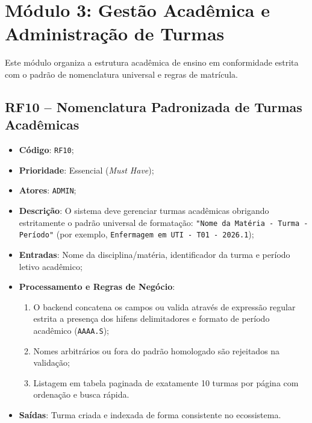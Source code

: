 \section{Módulo 3: Gestão Acadêmica e Administração de Turmas}
\label{sec_mod3_turmas}

Este módulo organiza a estrutura acadêmica de ensino em conformidade estrita com o padrão de nomenclatura universal e regras de matrícula.

\subsection{RF10 -- Nomenclatura Padronizada de Turmas Acadêmicas}
\begin{itemize}
    \item \textbf{Código}: \texttt{RF10};
    \item \textbf{Prioridade}: Essencial (\textit{Must Have});
    \item \textbf{Atores}: \texttt{ADMIN};
    \item \textbf{Descrição}: O sistema deve gerenciar turmas acadêmicas obrigando estritamente o padrão universal de formatação: \texttt{"Nome da Matéria - Turma - Período"} (por exemplo, \texttt{Enfermagem em UTI - T01 - 2026.1});
    \item \textbf{Entradas}: Nome da disciplina/matéria, identificador da turma e período letivo acadêmico;
    \item \textbf{Processamento e Regras de Negócio}:
    \begin{enumerate}
        \item O backend concatena os campos ou valida através de expressão regular estrita a presença dos hifens delimitadores e formato de período acadêmico (\texttt{AAAA.S});
        \item Nomes arbitrários ou fora do padrão homologado são rejeitados na validação;
        \item Listagem em tabela paginada de exatamente 10 turmas por página com ordenação e busca rápida.
    \end{enumerate}
    \item \textbf{Saídas}: Turma criada e indexada de forma consistente no ecossistema.
\end{itemize}

